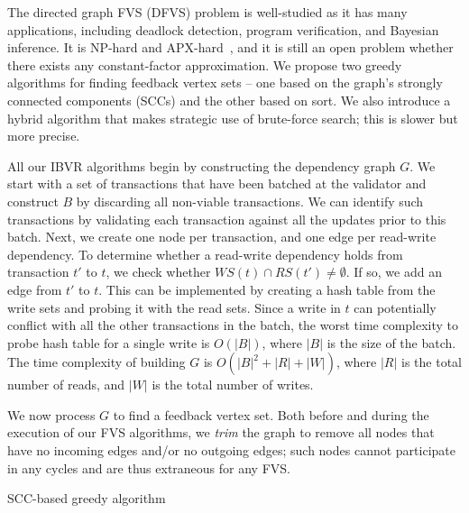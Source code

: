 The directed graph FVS (DFVS) problem is well-studied as it has many applications, including deadlock detection, program verification, and Bayesian inference. It is NP-hard and APX-hard~\cite{kann1992approximability, karp1972reducibility}, and it is still an open problem whether there exists any constant-factor approximation.
We propose two greedy algorithms for finding feedback vertex sets -- one based
on the graph's strongly connected components (SCCs) and the other based on sort.
We also introduce a hybrid algorithm that makes strategic use of brute-force search; this is slower but more precise.

All our IBVR algorithms begin by constructing the dependency graph $G$. We start with a set of transactions that have been batched at the validator and construct $B$ by discarding all non-viable transactions. We can identify such transactions by validating each transaction against all the updates prior to this batch.
Next, we create one node per transaction, and one edge per read-write dependency. To determine whether a read-write dependency holds from transaction $t'$ to $t$, we check whether $WS(t) \cap RS(t') \neq \emptyset$. If so, we add an edge from $t'$ to $t$. This can be implemented by creating a hash table from the write sets and probing it with the read sets. Since a write in $t$ can potentially conflict with all the other transactions in the batch, the worst time complexity to probe hash table for a single write is $O(|B|)$, where $|B|$ is the size of the batch. The time complexity of building $G$ is $O(|B|^2+|R|+|W|)$, where $|R|$ is the total number of reads, and $|W|$ is the total number of writes. 

We now process $G$ to find a feedback vertex set. Both before and during the
execution of our FVS algorithms, we \emph{trim} the graph to remove all nodes
that have no incoming edges and/or no outgoing edges; such nodes cannot
participate in any cycles and are thus extraneous for any FVS.

\begin{algorithm}[t]
\SetAlgoLined\DontPrintSemicolon
{}


\caption{SCC-based greedy algorithm}
\label{alg:scc}
\end{algorithm}


